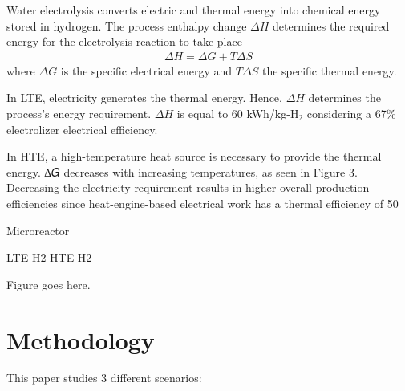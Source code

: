 \documentclass{anstrans}
\begin{document}
Water electrolysis converts electric and thermal energy into chemical energy stored in hydrogen.
The process enthalpy change $\Delta H$ determines the required energy for the electrolysis reaction to
take place
\begin{align}
\Delta H = \Delta G + T \Delta S
\end{align}
where $\Delta G$ is the specific electrical energy and $T \Delta S$ the specific thermal energy.


In LTE, electricity generates the thermal energy.
Hence, $\Delta H$ determines the process’s energy requirement.
$\Delta H$ is equal to 60 kWh/kg-H$_2$ considering a 67\% electrolizer electrical efficiency.

In HTE, a high-temperature heat source is necessary to provide the thermal energy.
∆𝐺 decreases with increasing temperatures, as seen in Figure 3. Decreasing the electricity
requirement results in higher overall production efficiencies since heat-engine-based electrical
work has a thermal efficiency of 50%



Microreactor

LTE-H2
HTE-H2


Figure goes here.




\section{Methodology}

This paper studies 3 different scenarios:
\end{document}
